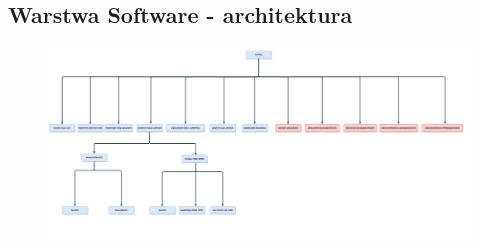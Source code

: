 \documentclass[12pt] {article}
\begin{document}
\subsection{Warstwa Software - architektura}
\begin{figure}[H]
\centering
\includegraphics[width=\textwidth]{res/HDL_Hierarchy.pdf}
\end{figure}
\end{document}
